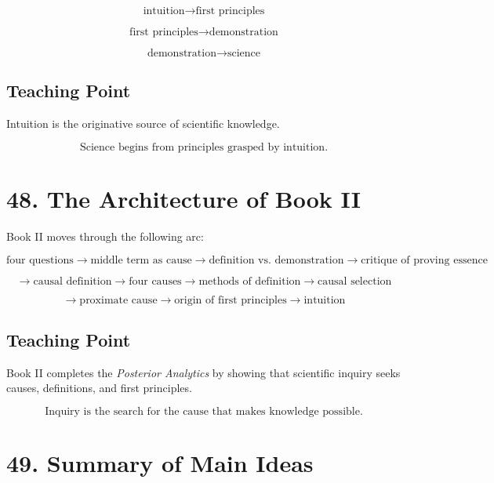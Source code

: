 \documentclass[12pt]{article}
\begin{document}
\[
\text{intuition} \rightarrow \text{first principles}
\]

\[
\text{first principles} \rightarrow \text{demonstration}
\]

\[
\text{demonstration} \rightarrow \text{science}
\]

\subsection*{Teaching Point}

Intuition is the originative source of scientific knowledge.

\[
\boxed{
\text{Science begins from principles grasped by intuition.}
}
\]

\section*{48. The Architecture of Book II}

Book II moves through the following arc:

\[
\text{four questions}
\rightarrow
\text{middle term as cause}
\rightarrow
\text{definition vs. demonstration}
\rightarrow
\text{critique of proving essence}
\]

\[
\rightarrow
\text{causal definition}
\rightarrow
\text{four causes}
\rightarrow
\text{methods of definition}
\rightarrow
\text{causal selection}
\]

\[
\rightarrow
\text{proximate cause}
\rightarrow
\text{origin of first principles}
\rightarrow
\text{intuition}
\]

\subsection*{Teaching Point}

Book II completes the \textit{Posterior Analytics} by showing that scientific
inquiry seeks causes, definitions, and first principles.

\[
\boxed{
\text{Inquiry is the search for the cause that makes knowledge possible.}
}
\]

\section*{49. Summary of Main Ideas}
\end{document}
